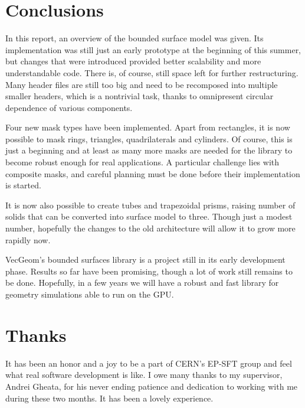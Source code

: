\documentclass[12pt, a4paper]{article}
\begin{document}
\section{Conclusions}

 In this report, an overview of the bounded surface model was given. Its implementation was still just an early prototype at the beginning of this summer, but changes that were introduced provided better scalability and more understandable code. There is, of course, still space left for further restructuring. Many header files are still too big and need to be recomposed into multiple smaller headers, which is a nontrivial task, thanks to omnipresent circular dependence of various components.
 
 Four new mask types have been implemented. Apart from rectangles, it is now possible to mask rings, triangles, quadrilaterals and cylinders. Of course, this is just a beginning and at least as many more masks are needed for the library to become robust enough for real applications. A particular challenge lies with composite masks, and careful planning must be done before their implementation is started.
 
 It is now also possible to create tubes and trapezoidal prisms, raising number of solids that can be converted into surface model to three. Though just a modest number, hopefully the changes to the old architecture will allow it to grow more rapidly now.
 
 VecGeom's bounded surfaces library is a project still in its early development phase. Results so far have been promising, though a lot of work still remains to be done. Hopefully, in a few years we will have a robust and fast library for geometry simulations able to run on the GPU. 


\section*{Thanks}

It has been an honor and a joy to be a part of CERN's EP-SFT group and feel what real software development is like. I owe many thanks to my supervisor, Andrei Gheata, for his never ending patience and dedication to working with me during these two months. It has been a lovely experience.


\end{document}
